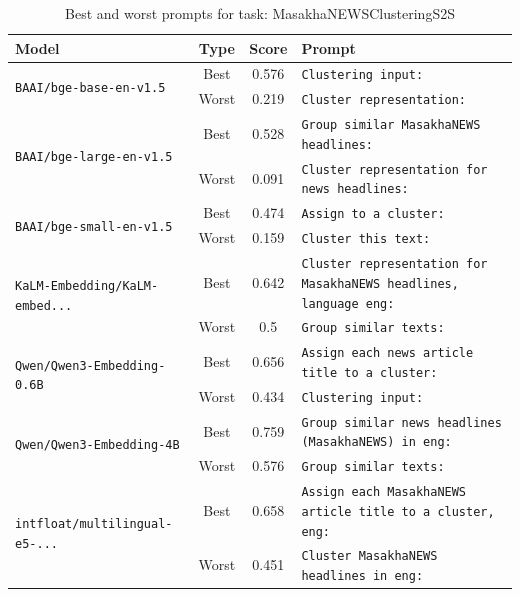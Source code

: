 \begin{table}[t]
\centering
\small
\caption{Best and worst prompts for task: MasakhaNEWSClusteringS2S}
\begin{tabular}{|p{}|c|c|p{}|}
\hline
Model & Type & Score & Prompt \\
\hline
\multirow{2}{=}{\raggedright\texttt{BAAI/\allowbreak bge-\allowbreak base-\allowbreak en-\allowbreak v1.5}} & Best & 0.576 & \texttt{Clustering input:} \\
\cline{2-4}
& Worst & 0.219 & \texttt{Cluster representation:} \\
\hline
\multirow{2}{=}{\raggedright\texttt{BAAI/\allowbreak bge-\allowbreak large-\allowbreak en-\allowbreak v1.5}} & Best & 0.528 & \texttt{Group similar MasakhaNEWS headlines:} \\
\cline{2-4}
& Worst & 0.091 & \texttt{Cluster representation for news headlines:} \\
\hline
\multirow{2}{=}{\raggedright\texttt{BAAI/\allowbreak bge-\allowbreak small-\allowbreak en-\allowbreak v1.5}} & Best & 0.474 & \texttt{Assign to a cluster:} \\
\cline{2-4}
& Worst & 0.159 & \texttt{Cluster this text:} \\
\hline
\multirow{2}{=}{\raggedright\texttt{KaLM-\allowbreak Embedding/\allowbreak KaLM-\allowbreak embed...}} & Best & 0.642 & \texttt{Cluster representation for MasakhaNEWS headlines, language eng:} \\
\cline{2-4}
& Worst & 0.5 & \texttt{Group similar texts:} \\
\hline
\multirow{2}{=}{\raggedright\texttt{Qwen/\allowbreak Qwen3-\allowbreak Embedding-\allowbreak 0.6B}} & Best & 0.656 & \texttt{Assign each news article title to a cluster:} \\
\cline{2-4}
& Worst & 0.434 & \texttt{Clustering input:} \\
\hline
\multirow{2}{=}{\raggedright\texttt{Qwen/\allowbreak Qwen3-\allowbreak Embedding-\allowbreak 4B}} & Best & 0.759 & \texttt{Group similar news headlines (MasakhaNEWS) in eng:} \\
\cline{2-4}
& Worst & 0.576 & \texttt{Group similar texts:} \\
\hline
\multirow{2}{=}{\raggedright\texttt{intfloat/\allowbreak multilingual-\allowbreak e5-\allowbreak ...}} & Best & 0.658 & \texttt{Assign each MasakhaNEWS article title to a cluster, eng:} \\
\cline{2-4}
& Worst & 0.451 & \texttt{Cluster MasakhaNEWS headlines in eng:} \\
\hline
\end{tabular}
\end{table}

